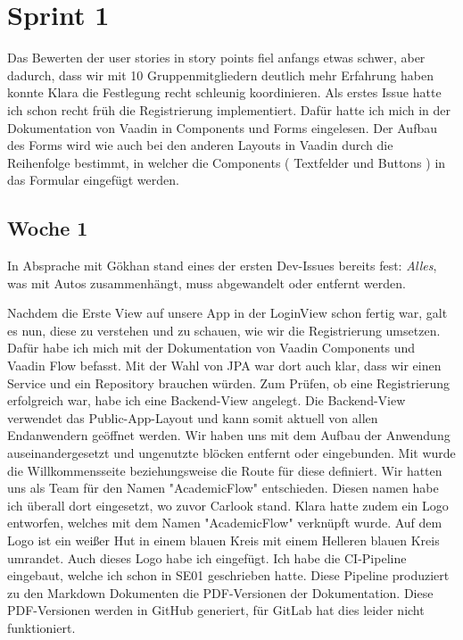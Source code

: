 

\section{Sprint 1}\label{sec:sprint1}
Das Bewerten der user stories in story points fiel anfangs etwas schwer, aber dadurch, dass wir mit 10 Gruppenmitgliedern
deutlich mehr Erfahrung haben konnte Klara die Festlegung recht schleunig koordinieren.
Als erstes Issue hatte ich schon recht früh die Registrierung implementiert.
Dafür hatte ich mich in der Dokumentation von Vaadin in Components und Forms eingelesen.
Der Aufbau des Forms wird wie auch bei den anderen Layouts in Vaadin durch die Reihenfolge bestimmt,
in welcher die Components ( Textfelder und Buttons ) in das Formular eingefügt werden.

\subsection{Woche 1}\label{subsec:woche1}
In Absprache mit Gökhan stand eines der ersten Dev-Issues bereits fest: \emph{Alles}, was mit Autos
zusammenhängt, muss abgewandelt oder entfernt werden.

Nachdem die Erste View auf unsere App in der LoginView schon fertig war, galt es nun, diese zu verstehen und zu schauen,
wie wir die Registrierung umsetzen.
Dafür habe ich mich mit der Dokumentation von Vaadin Components und Vaadin Flow befasst.
Mit der Wahl von JPA war dort auch klar, dass wir einen Service und ein Repository brauchen würden.
Zum Prüfen, ob eine Registrierung erfolgreich war, habe ich eine Backend-View angelegt.
Die Backend-View verwendet das Public-App-Layout und kann somit aktuell von allen Endanwendern
geöffnet werden.
Wir haben uns mit dem Aufbau der Anwendung auseinandergesetzt und ungenutzte blöcken entfernt oder
eingebunden.
Mit  wurde die Willkommensseite
beziehungsweise die Route für diese definiert.
Wir hatten uns als Team für den Namen "AcademicFlow" entschieden.
Diesen namen habe ich überall dort eingesetzt, wo zuvor Carlook stand.
Klara hatte zudem ein Logo entworfen, welches mit dem Namen "AcademicFlow" verknüpft wurde.
Auf dem Logo ist ein weißer Hut in einem blauen Kreis mit einem Helleren blauen
Kreis umrandet.
Auch dieses Logo habe ich eingefügt.
Ich habe die CI-Pipeline eingebaut, welche ich schon in SE01 geschrieben hatte.
Diese Pipeline produziert zu den Markdown Dokumenten die PDF-Versionen der Dokumentation.
Diese PDF-Versionen werden in GitHub generiert, für GitLab hat dies leider nicht funktioniert.

